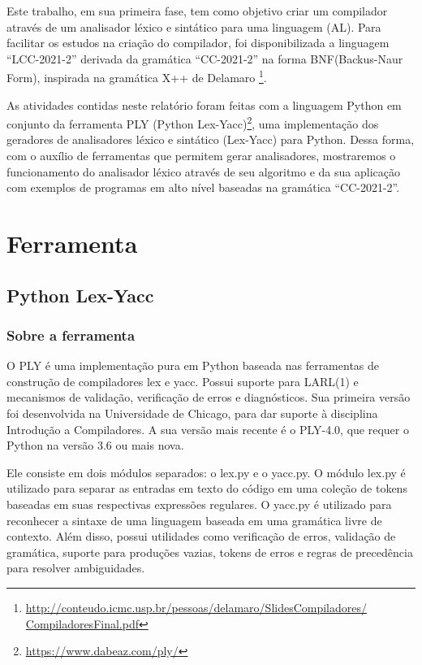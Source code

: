 \documentclass[
	12pt,				%
	openright,			%
	twoside,			%
	a4paper,			%
	english,			%
	french,				%
	spanish,			%
	brazil				%
	]{abntex2}
\begin{document}
Este trabalho, em sua primeira fase, tem como objetivo criar um compilador através de um
analisador léxico e sintático para uma linguagem (AL). Para facilitar os estudos na criação do compilador,
foi disponibilizada a linguagem ``LCC-2021-2'' derivada da gramática ``CC-2021-2''
na forma BNF(Backus-Naur Form), inspirada na gramática X++ de Delamaro
\footnote{\url{http://conteudo.icmc.usp.br/pessoas/delamaro/SlidesCompiladores/
CompiladoresFinal.pdf}}.

As atividades contidas neste relatório foram feitas com a linguagem Python em
conjunto da ferramenta PLY (Python Lex-Yacc)\footnote{\url{https://www.dabeaz.com/ply/}},
uma implementação dos geradores de analisadores léxico e sintático (Lex-Yacc) para Python.
Dessa forma, com o auxílio de ferramentas que permitem gerar analisadores, mostraremos
o funcionamento do analisador léxico através de seu algoritmo e da sua aplicação com 
exemplos de programas em alto nível baseadas na gramática ``CC-2021-2''.




\part{Ferramenta}
\chapter{Python Lex-Yacc}
\section{Sobre a ferramenta}
O PLY é uma implementação pura em Python baseada nas ferramentas de construção
de compiladores lex e yacc. Possui suporte para LARL(1) e mecanismos
de validação, verificação de erros e diagnósticos. Sua primeira versão foi desenvolvida
na Universidade de Chicago, para dar suporte à disciplina Introdução a Compiladores.
A sua versão mais recente é o PLY-4.0, que requer o Python na versão 3.6 ou mais nova. 

Ele consiste em dois módulos separados: o lex.py e o yacc.py. O módulo lex.py é utilizado
para separar as entradas em texto do código em uma coleção de tokens baseadas em suas respectivas 
expressões regulares. O yacc.py é utilizado para reconhecer a sintaxe de uma linguagem 
baseada em uma gramática livre de contexto. Além disso, possui utilidades como verificação
de erros, validação de gramática, suporte para produções vazias, tokens de erros e regras de
precedência para resolver ambiguidades.
\end{document}
